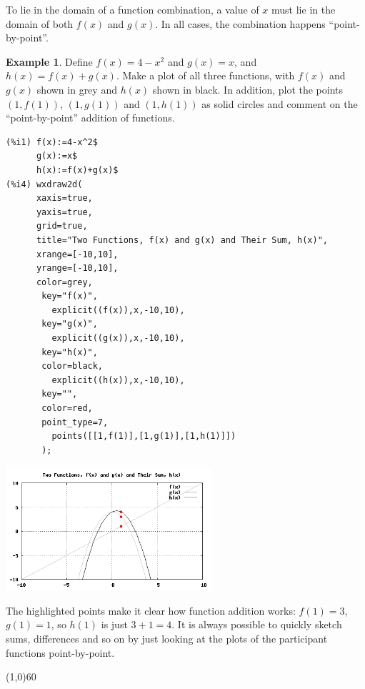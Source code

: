\documentclass[10.5pt,twoside]{report}
\theoremstyle{definition}
\newtheorem{exmp}{Example}[section]
\begin{document}
To lie in the domain of a function combination, a value of $x$ must lie in the domain of both $f(x)$ and $g(x)$.  In all cases, the combination happens ``point-by-point''.

\begin{exmp}
Define $f(x)=4-x^2$ and $g(x)=x$, and $h(x)=f(x)+g(x)$.  Make a plot of all three functions, with $f(x)$ and $g(x)$ shown in grey and $h(x)$ shown in black.  In addition, plot the points $(1,f(1))$, $(1,g(1))$ and $(1,h(1))$ as solid circles and comment on the ``point-by-point'' addition of functions. \\

\begin{verbatim}
(%i1) f(x):=4-x^2$
      g(x):=x$
      h(x):=f(x)+g(x)$
(%i4) wxdraw2d(
      xaxis=true,
      yaxis=true,
      grid=true,
      title="Two Functions, f(x) and g(x) and Their Sum, h(x)",
      xrange=[-10,10],
      yrange=[-10,10],
      color=grey,
       key="f(x)",
         explicit((f(x)),x,-10,10),
       key="g(x)",
         explicit((g(x)),x,-10,10),
       key="h(x)",
       color=black,
         explicit((h(x)),x,-10,10),
       key="",
       color=red,
       point_type=7,
         points([[1,f(1)],[1,g(1)],[1,h(1)]])
       );
\end{verbatim}

\includegraphics[width=3in]{example_2_2_1}

The highlighted points make it clear how function addition works: $f(1)=3$, $g(1)=1$, so $h(1)$ is just $3+1=4$.  It is always possible to quickly sketch sums, differences and so on by just looking at the plots of the participant functions point-by-point.

\end{exmp}

\line(1,0){60}
\linethickness{0.5mm}
\end{document}
